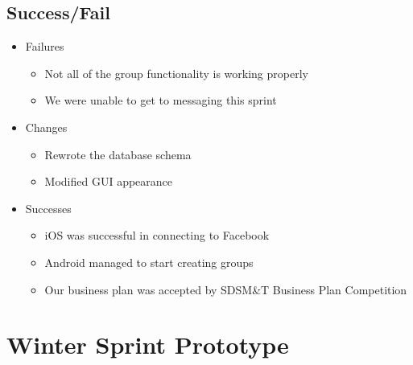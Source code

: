 \subsection{Success/Fail}
\begin{itemize}
	\item Failures
	\begin{itemize}
		\item Not all of the group functionality is working properly
		\item We were unable to get to messaging this sprint
	\end{itemize}
	\item Changes
	\begin{itemize}
		\item Rewrote the database schema
		\item Modified GUI appearance
	\end{itemize}
	\item Successes
	\begin{itemize}
		\item iOS was successful in connecting to Facebook
		\item Android managed to start creating groups
		\item Our business plan was accepted by SDSM\&T Business Plan Competition
	\end{itemize}
\end{itemize}

\section{Winter Sprint Prototype}


